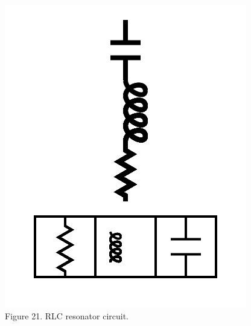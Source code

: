 \documentclass[11pt]{article}
\begin{document}
\begin{figure}

\includegraphics[width=\linewidth]{figures/figure21_rlc.png}

\caption{Figure 21. RLC resonator circuit.}
\end{figure}
\end{document}
